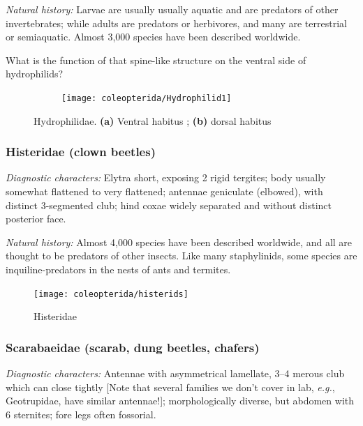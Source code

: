 \noindent{}\textit{Natural history:} Larvae are usually usually aquatic and are predators of other invertebrates; while adults are predators or herbivores, and many are terrestrial or semiaquatic. Almost 3,000 species have been described worldwide.

\begin{theo}
{}What is the function of that spine-like structure on the ventral side of hydrophilids?
\end{theo}

\begin{figure}[ht!]
  \centering
\begin{subfigure}[ht!]{0.4\textwidth}
    \texttt{[image: coleopterida/Hydrophilid1]}
  \caption{}
  \label{fig:hydrophilid1}
\end{subfigure}
    \qquad
\begin{subfigure}[ht!]{0.35\textwidth}
  \caption{}
  \label{fig:hydrophilid2}
\end{subfigure}
    \caption{Hydrophilidae. \textbf{(a)} Ventral habitus \citep[][Fig. Fig. 13:36]{bhlitem126080aquatic}; \textbf{(b)} dorsal habitus \citep[][pg. 99]{brehm1877brehms}}\label{fig:hydrophilids}
\end{figure}

\subsubsection{Histeridae (clown beetles)}
\noindent{}\textit{Diagnostic characters:} Elytra short, exposing 2 rigid tergites; body usually somewhat flattened to very flattened; antennae geniculate (elbowed), with distinct 3-segmented club; hind coxae widely separated and without distinct posterior face.\vspace{3mm}

\noindent{}\textit{Natural history:} Almost 4,000 species have been described worldwide, and all are thought to be predators of other insects. Like many staphylinids, some species are inquiline-predators in the nests of ants and termites.

\begin{figure}[ht!]
  \centering
    \texttt{[image: coleopterida/histerids]}
  \caption{Histeridae \citep[modified from][Plate 21, Figs. 20,22]{bhlitem240513beetles}}
  \label{fig:histerid}
\end{figure}

\subsubsection{Scarabaeidae (scarab, dung beetles, chafers)}
\noindent{}\textit{Diagnostic characters:} Antennae with asymmetrical lamellate, 3--4 merous club which can close tightly [Note that several families we don't cover in lab, \textit{e.g.}, Geotrupidae, have similar antennae!]; morphologically diverse, but abdomen with 6 sternites; fore legs often fossorial.\vspace{3mm}

